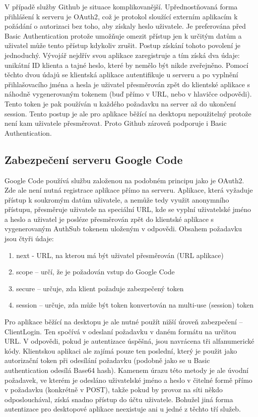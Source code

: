 V případě služby Github je situace komplikovanější\cite{github:summary}. Upřednostňovaná forma přihlášení k serveru je OAuth2\cite{github:oauth}, což je protokol sloužící externím aplikacím k požádání o autorizaci bez toho, aby získaly heslo uživatele. Je preferována před Basic Authentication protože umožňuje omezit přístup jen k určitým datům a uživatel může tento přístup kdykoliv zrušit. Postup získání tohoto povolení je jednoduchý. Vývojář nejdřív svou aplikace zaregistruje a tím získá dva údaje: unikátní ID klienta a tajné heslo, které by nemělo být nikde zveřejněno. Pomocí těchto dvou údajů se klientská aplikace autentifikuje u serveru a po vyplnění přihlašovacího jména a hesla je uživatel přesměrován zpět do klientské aplikace s náhodně vygenerovaným tokenem (buď přímo v URL, nebo v hlavičce odpovědi). Tento token je pak používán u každého požadavku na server až do ukončení session. Tento postup je ale pro aplikace běžící na desktopu nepoužitelný protože není kam uživatele přesměrovat. Proto Github zároveň podporuje i Basic Authentication.

\subsection{Zabezpečení serveru Google Code}

Google Code používá službu\cite{googleauth} založenou na podobném principu jako je OAuth2. Zde ale není nutná registrace aplikace přímo na serveru. Aplikace, která vyžaduje přístup k soukromým datům uživatele, a nemůže tedy využit anonymního přístupu, přesměruje uživatele na speciální URL, kde se vyplní uživatelské jméno a heslo a uživatel je posléze přesměrován zpět do klientské aplikace s vygenerovaným AuthSub tokenem uloženým v odpovědi. Obsahem požadavku jsou čtyři údaje:

\begin{enumerate}
\item next - URL, na kterou má být uživatel přesměrován (URL aplikace)
\item scope – určí, že je požadován vstup do Google Code
\item secure – určuje, zda klient požaduje zabezpečený token
\item session – určuje, zda může být token konvertován na multi-use (session) token
\end{enumerate}

Pro aplikace běžící na desktopu je ale nutné použít nižší úroveň zabezpečení – ClientLogin. Ten spočívá v odeslaní požadavku v daném formátu na určitou URL. V odpovědi, pokud je autentizace úspěšná, jsou navrácena tři alfanumerické kódy. Klientskou aplikaci ale zajímá pouze ten poslední, který je použit jako autorizační token při odesílání požadavku (podobně jako se u Basic authentication odesílá Base64 hash). Kamenem úrazu této metody je ale úvodní požadavek, ve kterém je odesláno uživatelské jméno a heslo v čitelné formě přímo v požadavku (konkrétně v POST), takže pokud by provoz na síti někdo odposlouchával, získá snadno přístup do účtu uživatele. Bohužel jiná forma autentizace pro desktopové aplikace neexistuje ani u jedné z těchto tří služeb.

